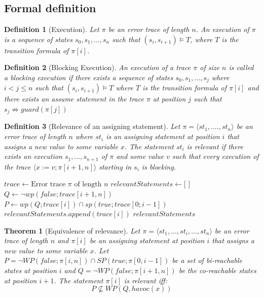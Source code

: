 \documentclass{article}
\newcommand{\limp}{\Rightarrow}
\newtheorem{mydef}{Definition}
\newtheorem{theorem}{Theorem}
\begin{document}
\subsection{Formal definition}
\begin{mydef}[Execution]\label{mydef:execution}
Let $\pi$ be an error trace of length $n$. An execution of $\pi$ is a sequence of states $s_0, s_1,...,s_n$ such that $(s_i, s_{i+1}) \vDash T$, where $T$ is the transition formula of $\pi[i]$.
\end{mydef}
\begin{mydef}[Blocking Execution]\label{mydef:blocked_execution}
An execution of a trace $\pi$ of size $n$ is called a \emph{blocking execution} if there exists a sequence of states $s_0,s_1,...,s_j$ where $i<j \leq n$ such that $(s_i, s_{i+1}) \vDash T$ where $T$ is the transition formula of $\pi[i]$ and there exists an assume statement in the trace $\pi$ at position $j$ such that $s_j \not \limp guard(\pi[j])$
\end{mydef}

\begin{mydef}[Relevance of an assigning statement]\label{mydef:responsible}
Let $\pi = \langle st_1,....,st_n \rangle$ be an error trace of length $n$ where $st_i$ is an assigning statement at position $i$ that assigns a new value to some variable $x$. The statement $st_i$ is relevant if there exists an execution $s_1,...,s_{n+1}$ of $\pi$ and some value $v$ such that every execution of the trace $\langle x:=v; \pi[i+1,n] \rangle$ starting in $s_i$ is blocking.
\end{mydef}

\begin{algorithm}
\caption{Relevance of an assigning statement}\label{relevance}
\begin{algorithmic}[1]
\State $trace \gets \text{Error trace } \pi \text{ of length } \textit{n}$
\State $relevantStatements \gets \text{[ ]}$
\State $Q \gets \neg wp(false;trace[i+1,n])$
\State $P \gets wp(Q; trace[i]) \cap sp(true; trace[0;i-1])$
\State $relevantStatements.append(trace[i])$
\EndIf
\EndFor
\Return $relevantStatements$
\EndProcedure
\end{algorithmic}
\end{algorithm}
\begin{theorem}[Equivalence of relevance]\label{mydef:relevancytheorem}
Let $\pi = \langle st_1,...,st_i,...,st_n \rangle$ be an error trace of length $n$ and $\pi[i]$ be an assigning statement at position $i$ that assigns a new value to some variable $x$. Let $P = \neg WP(false; \pi[i,n]) \cap SP(true; \pi[0,i-1])$ be a set of bi-reachable states at position $i$ and $Q =  \neg WP(false; \pi[i+1,n])$ be the co-reachable states at position $i+1$. The statement $\pi[i]$ is relevant iff:
 $$P \not \subseteq WP(Q,havoc(x))$$
\end{theorem}
\end{document}
